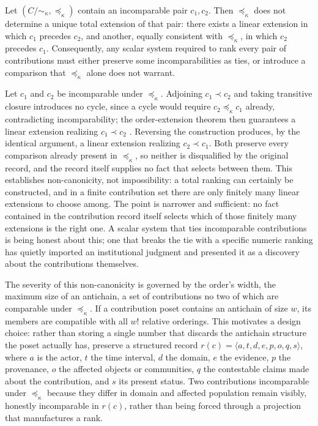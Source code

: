 \begin{proposition}
Let $(C/{\sim_\kappa}, \preceq_\kappa)$ contain an incomparable pair $c_1, c_2$. Then $\preceq_\kappa$ does not determine a unique total extension of that pair: there exists a linear extension in which $c_1$ precedes $c_2$, and another, equally consistent with $\preceq_\kappa$, in which $c_2$ precedes $c_1$. Consequently, any scalar system required to rank every pair of contributions must either preserve some incomparabilities as ties, or introduce a comparison that $\preceq_\kappa$ alone does not warrant.
\end{proposition}

Let $c_1$ and $c_2$ be incomparable under $\preceq_\kappa$. Adjoining $c_1 \prec c_2$ and taking transitive closure introduces no cycle, since a cycle would require $c_2 \preceq_\kappa c_1$ already, contradicting incomparability; the order-extension theorem then guarantees a linear extension realizing $c_1 \prec c_2$ \cite{szpilrajn1930}. Reversing the construction produces, by the identical argument, a linear extension realizing $c_2 \prec c_1$. Both preserve every comparison already present in $\preceq_\kappa$, so neither is disqualified by the original record, and the record itself supplies no fact that selects between them. This establishes non-canonicity, not impossibility: a total ranking can certainly be constructed, and in a finite contribution set there are only finitely many linear extensions to choose among. The point is narrower and sufficient: no fact contained in the contribution record itself selects which of those finitely many extensions is the right one. A scalar system that ties incomparable contributions is being honest about this; one that breaks the tie with a specific numeric ranking has quietly imported an institutional judgment and presented it as a discovery about the contributions themselves.

The severity of this non-canonicity is governed by the order's width, the maximum size of an antichain, a set of contributions no two of which are comparable under $\preceq_\kappa$. If a contribution poset contains an antichain of size $w$, its members are compatible with all $w!$ relative orderings. This motivates a design choice: rather than storing a single number that discards the antichain structure the poset actually has, preserve a structured record $r(c) = \langle a, t, d, e, p, o, q, s \rangle$, where $a$ is the actor, $t$ the time interval, $d$ the domain, $e$ the evidence, $p$ the provenance, $o$ the affected objects or communities, $q$ the contestable claims made about the contribution, and $s$ its present status. Two contributions incomparable under $\preceq_\kappa$ because they differ in domain and affected population remain visibly, honestly incomparable in $r(c)$, rather than being forced through a projection that manufactures a rank.

